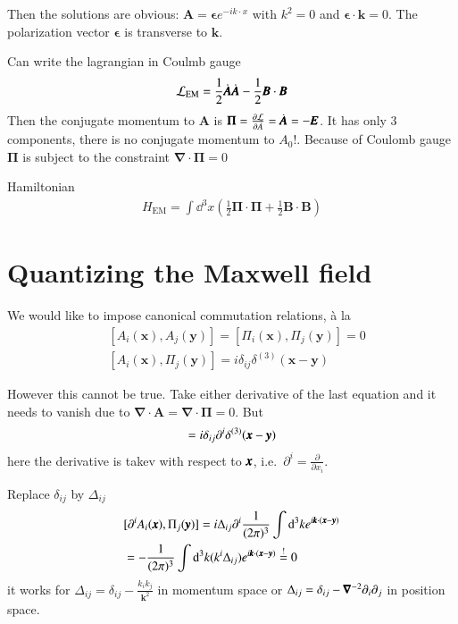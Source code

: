 Then the solutions are obvious: $\pmb{A} = \pmb{\epsilon} e^{-ik\cdot x}$ with $k^2=0$ and $\pmb{\epsilon}\cdot\pmb{k}=0$. The polarization vector $\pmb{\epsilon}$ is transverse to $\pmb{k}$.

Can write the lagrangian in Coulmb gauge 
\begin{align*}
	\mathcal{L}_\text{EM} = \frac{1}{2}\dot{\pmb{A}}\dot{\pmb{A}} - \frac{1}{2} \pmb{B}\cdot \pmb{B}
\end{align*}
Then the conjugate momentum to $\pmb{A}$ is $\pmb{\Pi} = \frac{\partial \mathcal{L}}{\partial \dot{A}} = \dot{\pmb{A}} = -\pmb{E}$. It has only 3 components, there is no conjugate momentum to $A_0$!. Because of Coulomb gauge $\pmb{\Pi}$ is subject to the constraint $\pmb{\nabla}\cdot\pmb{\Pi} = 0$

Hamiltonian
\begin{align*}
	H_{\text{EM}} = \int \dd^3 x \left( \frac{1}{2} \pmb{\Pi}\cdot\pmb{\Pi} + \frac{1}{2} \pmb{B}\cdot\pmb{B} \right)
\end{align*}

\section{Quantizing the Maxwell field}
We would like to impose canonical commutation relations, à la
\begin{align*}
	&[ A_i(\pmb{x}), A_j (\pmb{y}) ] =  [ \Pi_i(\pmb{x}), \Pi_j (\pmb{y}) ] = 0 \\
	&[A_i(\pmb{x}), \Pi_j(\pmb{y})] = i \delta_{ij} \delta^{(3)} (\pmb{x} - \pmb{y})
\end{align*}

However this cannot be true. Take either derivative of the last equation and it needs to vanish due to $\pmb{\nabla}\cdot\pmb{A} = \pmb{\nabla}\cdot \pmb{\Pi} = 0$. But 
\begin{align*}
	[\partial^i A_i (\vecx), \Pi_k(\vecy)] =  i \delta_{ij} \partial^i \delta^{(3)}(\vecx-\vecy)
\end{align*}
here the derivative is takev with respect to $\pmb{x}$, i.e.~$\partial^i = \frac{\partial}{\partial x_i}$.


Replace $\delta_{ij}$ by $\Delta_{ij}$
\begin{align*}
	& [\partial^i A_i (\pmb{x}), {\Pi}_{j}(\pmb{y})] = i \Delta_{ij} \partial^i \frac{1}{(2\pi)^3} \int \dd^3 k e^{i\pmb{k}\cdot(\pmb{x} - \pmb{y})} \\
	& = -\frac{1}{(2\pi)^3} \int \dd^3 k (k^i\Delta_{ij}) e^{i\pmb{k}\cdot(\pmb{x}-\pmb{y})} \stackrel{!}{=} 0
\end{align*}
it works for $\Delta_{ij} = \delta_{ij}-\frac{k_ik_j}{\pmb{k}^2}$ in momentum space or $\Delta_{ij} = \delta_{ij} - \pmb{\nabla}^{-2}\partial_i \partial_j$ in position space.

